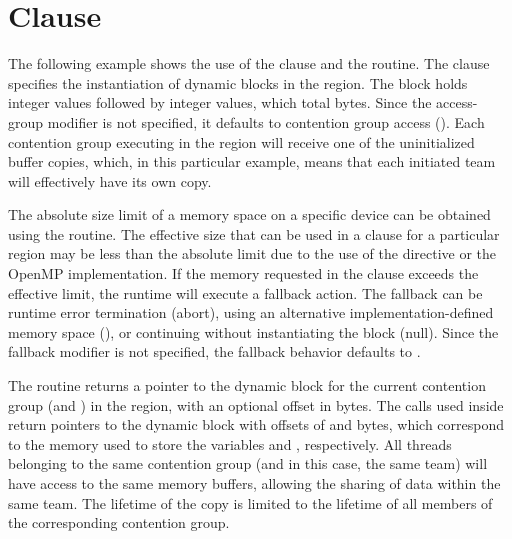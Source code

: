 \section{ Clause}
\label{sec:dyn_groupprivate}


The following example shows the use of the  clause 
and the  routine. The  
clause specifies the instantiation of dynamic  blocks in the  
region. The block holds  integer values followed by  integer 
values, which total  bytes. Since the access-group 
modifier is not specified, it defaults to contention group access (). 
Each contention group executing in the region will receive one of the uninitialized 
 buffer copies, which, in this particular example, means that each 
initiated team will effectively have its own copy.

The absolute size limit of a  memory space on a specific device 
can be obtained using the  routine. The effective size 
that can be used in a  clause for a particular  region 
may be less than the absolute limit due to the use of the  directive 
or the OpenMP implementation. If the memory requested in the  
clause exceeds the effective limit, the runtime will execute a fallback action. The fallback 
can be runtime error termination (abort), using an alternative implementation-defined 
memory space (), or continuing without instantiating the block (null). Since 
the fallback modifier is not specified, the fallback behavior defaults to .

The  routine returns a pointer to the dynamic 
 block for the current contention group (and ) in the 
 region, with an optional offset in bytes. The  calls used inside  return pointers to the dynamic  block with 
offsets of  and  bytes, which correspond to the memory used to store 
the variables  and , respectively. All threads belonging to the same contention group 
(and in this case, the same team) will have access to the same memory buffers, allowing 
the sharing of data within the same team. The lifetime of the copy is limited to the lifetime 
of all members of the corresponding contention group.



